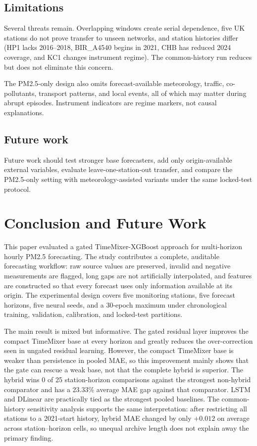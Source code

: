 \documentclass[sn-mathphys-num]{sn-jnl}
\begin{document}
\subsection{Limitations}
\label{sec:discussion-limitations}

Several threats remain. Overlapping windows create serial dependence, five UK
stations do not prove transfer to unseen networks, and station histories differ
(HP1 lacks 2016--2018, BIR\_A4540 begins in 2021, CHB has reduced 2024 coverage,
and KC1 changes instrument regime). The common-history run reduces but does not
eliminate this concern.

The PM2.5-only design also omits forecast-available meteorology, traffic,
co-pollutants, transport patterns, and local events, all of which may matter
during abrupt episodes. Instrument indicators are regime markers, not causal
explanations.

\subsection{Future work}
\label{sec:discussion-future}

Future work should test stronger base forecasters, add only origin-available
external variables, evaluate leave-one-station-out transfer, and compare the
PM2.5-only setting with meteorology-assisted variants under the same locked-test
protocol.

\section{Conclusion and Future Work}
\label{sec:conclusion}

This paper evaluated a gated TimeMixer-XGBoost approach for multi-horizon
hourly PM2.5 forecasting. The study contributes a complete, auditable
forecasting workflow: raw source values are preserved, invalid and negative
measurements are flagged, long gaps are not artificially interpolated, and
features are constructed so that every forecast uses only information
available at its origin. The experimental design covers five monitoring
stations, five forecast horizons, five neural seeds, and a 30-epoch maximum
under chronological training, validation, calibration, and locked-test
partitions.

The main result is mixed but informative. The gated residual layer improves
the compact TimeMixer base at every horizon and greatly reduces the
over-correction seen in ungated residual learning. However, the compact
TimeMixer base is weaker than persistence in pooled MAE, so this improvement
mainly shows that the gate can rescue a weak base, not that the complete hybrid
is superior. The hybrid wins 0 of 25 station-horizon comparisons against the
strongest non-hybrid comparator and has a 23.33\% average MAE gap against that
comparator. LSTM and DLinear are practically tied as the strongest pooled
baselines. The common-history sensitivity analysis supports the same
interpretation: after restricting all stations to a 2021-start history, hybrid
MAE changed by only \(+0.012\) on average across station--horizon cells, so
unequal archive length does not explain away the primary finding.
\end{document}
